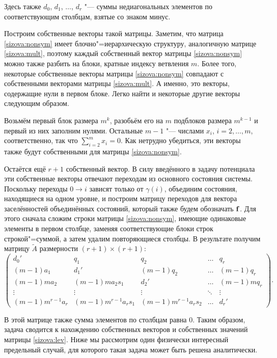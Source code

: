 Здесь также $d_0$, $d_1$, $\ldots$, $d_r$ "--- суммы
недиагональных элементов по соответствующим столбцам, взятые со
знаком минус.

Построим собственные векторы такой матрицы. Заметим, что матрица
\eqref{sizova:nonsym} имеет блочно"=иерархическую структуру,
аналогичную матрице \eqref{sizova:mult}, поэтому каждый
собственный вектор матрицы \eqref{sizova:nonsym} можно также
разбить на блоки, кратные индексу ветвления $m$. Более того,
некоторые собственные векторы матрицы \eqref{sizova:nonsym}
совпадают с собственными векторами матрицы \eqref{sizova:mult}. А
именно, это векторы, содержащие нули в первом блоке. Легко найти и
некоторые другие векторы следующим образом.

Возьмём первый блок размера $m^k$, разобьём его на $m$ подблоков
размера $m^{k - 1}$ и первый из них заполним нулями. Остальные $m
- 1$ "--- числами $x_i$, ${i = 2, \ldots, m}$, соответственно, так что
$\sum_{i = 2}^{m} x_i = 0$. Как нетрудно убедиться, эти векторы
также будут собственными для матрицы \eqref{sizova:nonsym}.

Остаётся ещё $r + 1$ собственный вектор. В силу введённого в
задачу потенциала эти собственные векторы отвечают переходам из
основного состояния системы. Поскольку переходы $0 \rightarrow i$
зависят только от $\gamma (i)$, объединим состояния, находящиеся
на одном уровне, и построим матрицу переходов для вектора
заселённостей объединённых состояний, который также будем
обозначать $\bold f$. Для этого сначала сложим строки матрицы
\eqref{sizova:nonsym}, имеющие одинаковые элементы в первом
столбце, заменяя соответствующие блоки строк строкой"=суммой, а
затем удалим повторяющиеся столбцы. В результате получим матрицу
$\tilde A$ размерности $(r + 1) \times (r + 1)$:
\begin{equation}
\begin{pmatrix}
d_0' & q_1 &  q_2 & \ldots & q_r\\
(m - 1) a_1 & d_1' & (m - 1) q_2 & \ldots & (m - 1) q_r \\
(m - 1) m a_2 &(m - 1) m a_2 s_1 & d_2' & \ldots & (m - 1) m q_r \\
\vdots & \vdots & \vdots & \ddots & \vdots \\
(m - 1) m^{r - 1} a_r & (m - 1) m^{r - 1} a_r s_1 & (m - 1) m^{r - 1} a_r s_2 & \ldots & d_r'
\end{pmatrix}. \label{sizova:lev}
\end{equation}

В этой матрице также сумма элементов по столбцам равна $0$. Таким
образом, задача сводится к нахождению собственных векторов и
собственных значений матрицы \eqref{sizova:lev}. Ниже мы
рассмотрим один физически интересный предельный случай, для
которого такая задача может быть решена аналитически.

